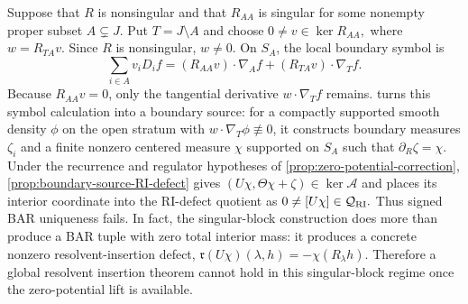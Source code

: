 \documentclass[aihp]{imsart}
\numberwithin{equation}{section}
\theoremstyle{plain}
\theoremstyle{definition}
\newcommand{\1}{\mathbf 1}
\begin{document}
Suppose that $R$ is nonsingular and that $R_{AA}$ is singular for some nonempty proper subset $A\subsetneq J$.  Put $T=J\setminus A$ and choose $0\ne v\in\ker R_{AA},$ where $w=R_{TA}v.$ Since $R$ is nonsingular, $w\ne0$.  On $S_A$, the local boundary symbol is
\begin{equation}\label{eq:unified-local-symbol}
 \sum_{i\in A}v_iD_i f
 =(R_{AA}v)\cdot\nabla_A f+(R_{TA}v)\cdot\nabla_T f.
\end{equation}
Because $R_{AA}v=0$, only the tangential derivative $w\cdot\nabla_T f$ remains.   turns this symbol calculation into a boundary source: for a compactly supported smooth density $\phi$ on the open stratum with $w\cdot\nabla_T\phi\not\equiv0$, it constructs boundary measures $\zeta_i$ and a finite nonzero centered measure $\chi$ supported on $S_A$ such that $\partial_R\zeta=\chi.$ Under the recurrence and regulator hypotheses of \cref{prop:zero-potential-correction}, \cref{prop:boundary-source-RI-defect} gives $(U\chi,\Theta\chi+\zeta)\in\ker\mathcal A$ and places its interior coordinate into the RI-defect quotient as $0\ne[U\chi]\in\mathcal Q_{\rm RI}.$ Thus signed BAR uniqueness fails.  In fact, the singular-block construction does more than produce a BAR tuple with zero total interior mass: it produces a concrete nonzero resolvent-insertion defect, $\mathfrak r(U\chi)(\lambda,h)
 =-\chi(R_\lambda h).$ Therefore a global resolvent insertion theorem cannot hold in this singular-block regime once the zero-potential lift is available.
\end{document}
